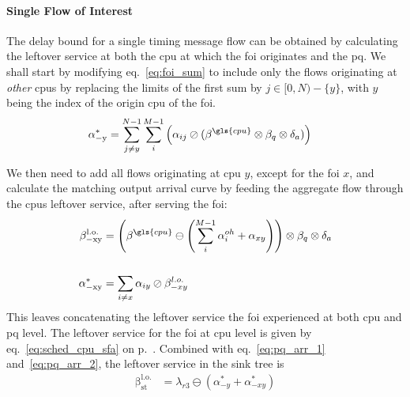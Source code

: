 \paragraph{Single Flow of Interest}
The delay bound for a single timing message flow can be obtained by calculating the leftover service at both the \gls{cpu} at which the \gls{foi}
originates and the \gls{pq}. We shall start by modifying eq.~\ref{eq:foi_sum} to include only the flows originating at \emph{other} \gls{cpu}s by replacing
the limits of the first sum by $j \in [0,N) - \{y\}$, with $y$ being the index of the origin \gls{cpu} of the \gls{foi}.
\begin{equation}
\begin{aligned}
\mathrm{\alpha^*_{-y}} &=  \sum_{j \neq y}^{N-1} \sum_i^{M-1} \left( \alpha_{ij} \oslash (\beta^{\gls{cpu}} \otimes \beta_q \otimes \delta_a) \right)
\label{eq:pq_arr_1}
\end{aligned}
\end{equation}
\par
We then need to add all flows originating at \gls{cpu} $y$, except for the \gls{foi} $x$, and calculate the matching output arrival curve by feeding
the aggregate flow through the \gls{cpu}s leftover service, after serving the \gls{foi}:
%
\begin{align}
\mathrm{\beta^{l.o.}_{-xy}} &=  \left( \beta^{\gls{cpu}}  \ominus  \left(\sum^{M-1}_{i} \alpha^{oh}_i + \alpha_{xy} \right) \right)  \otimes \beta_q \otimes \delta_a \\
\notag\\
\mathrm{\alpha^{*}_{-xy}} &= \sum_{i \neq x} \alpha_{iy} \oslash  \beta^{l.o.}_{-xy}\label{eq:pq_arr_2}
\end{align}
This leaves concatenating the leftover service the \gls{foi} experienced at both \gls{cpu} and \gls{pq} level. The leftover service for the \gls{foi} at \gls{cpu} level is given by eq.~\ref{eq:sched_cpu_sfa} on p.~\pageref{eq:sched_cpu_sfa}. 
Combined with eq.~\ref{eq:pq_arr_1} and~\ref{eq:pq_arr_2}, the leftover service in the sink tree is
%
%
\begin{equation}
\begin{aligned}
\mathrm{\beta^{l.o.}_{st}} &= \lambda_{r3} \ominus (\alpha^*_{-y} + \alpha^{*}_{-xy})
\label{eq:lo_serv}
\end{aligned}
\end{equation}



